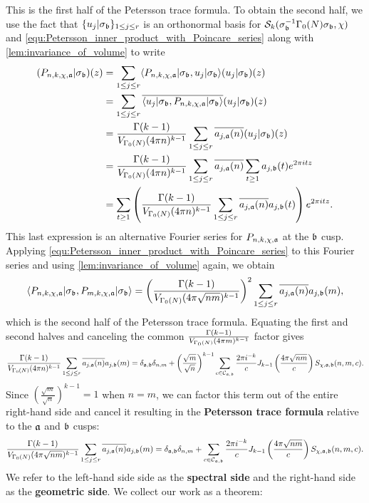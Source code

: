     This is the first half of the Petersson trace formula. To obtain the second half, we use the fact that $\{u_{j}|\sigma_{\mathfrak{b}}\}_{1 \le j \le r}$ is an orthonormal basis for $\mathcal{S}_{k}(\sigma_{\mathfrak{b}}^{-1}\Gamma_{0}(N)\sigma_{\mathfrak{b}},\chi)$ and \cref{equ:Petersson_inner_product_with_Poincare_series} along with \cref{lem:invariance_of_volume} to write
    \begin{align*}
      (P_{n,k,\chi,\mathfrak{a}}|\sigma_{\mathfrak{b}})(z) &= \sum_{1 \le j \le r}\langle P_{n,k,\chi,\mathfrak{a}}|\sigma_{\mathfrak{b}},u_{j}|\sigma_{\mathfrak{b}}\rangle(u_{j}|\sigma_{\mathfrak{b}})(z) \\
      &= \sum_{1 \le j \le r}\overline{\langle u_{j}|\sigma_{\mathfrak{b}},P_{n,k,\chi,\mathfrak{a}}|\sigma_{\mathfrak{b}}\rangle}(u_{j}|\sigma_{\mathfrak{b}})(z) \\
      &= \frac{\Gamma(k-1)}{V_{\Gamma_{0}(N)}(4\pi n)^{k-1}}\sum_{1 \le j \le r}\overline{a_{j,\mathfrak{a}}(n)}(u_{j}|\sigma_{\mathfrak{b}})(z) \\
      &= \frac{\Gamma(k-1)}{V_{\Gamma_{0}(N)}(4\pi n)^{k-1}}\sum_{1 \le j \le r}\overline{a_{j,\mathfrak{a}}(n)}\sum_{t \ge 1}a_{j,\mathfrak{b}}(t)e^{2\pi itz} \\
      &= \sum_{t \ge 1}\left(\frac{\Gamma(k-1)}{V_{\Gamma_{0}(N)}(4\pi n)^{k-1}}\sum_{1 \le j \le r}\overline{a_{j,\mathfrak{a}}(n)}a_{j,\mathfrak{b}}(t)\right)e^{2\pi itz}.
    \end{align*}
    This last expression is an alternative Fourier series for $P_{n,k,\chi,\mathfrak{a}}$ at the $\mathfrak{b}$ cusp. Applying \cref{equ:Petersson_inner_product_with_Poincare_series} to this Fourier series and using \cref{lem:invariance_of_volume} again, we obtain
    \[
      \langle P_{n,k,\chi,\mathfrak{a}}|\sigma_{\mathfrak{b}},P_{m,k,\chi,\mathfrak{a}}|\sigma_{\mathfrak{b}}\rangle = \left(\frac{\Gamma(k-1)}{V_{\Gamma_{0}(N)}(4\pi \sqrt{nm})^{k-1}}\right)^{2}\sum_{1 \le j \le r}\overline{a_{j,\mathfrak{a}}(n)}a_{j,\mathfrak{b}}(m),
    \]
    which is the second half of the Petersson trace formula. Equating the first and second halves and canceling the common $\frac{\Gamma(k-1)}{V_{\Gamma_{0}(N)}(4\pi m)^{k-1}}$ factor gives
    \[
      \frac{\Gamma(k-1)}{V_{\Gamma_{0}(N)}(4\pi n)^{k-1}}\sum_{1 \le j \le r}\overline{a_{j,\mathfrak{a}}(n)}a_{j,\mathfrak{b}}(m) = \delta_{\mathfrak{a},\mathfrak{b}}\delta_{n,m}+\left(\frac{\sqrt{m}}{\sqrt{n}}\right)^{k-1}\sum_{c \in \mathcal{C}_{\mathfrak{a},\mathfrak{b}}}\frac{2\pi i^{-k}}{c}J_{k-1}\left(\frac{4\pi\sqrt{nm}}{c}\right)S_{\chi,\mathfrak{a},\mathfrak{b}}(n,m,c).
    \]
    Since $\left(\frac{\sqrt{m}}{\sqrt{n}}\right)^{k-1} = 1$ when $n = m$, we can factor this term out of the entire right-hand side and cancel it resulting in the \textbf{Petersson trace formula} relative to the $\mathfrak{a}$ and $\mathfrak{b}$ cusps:
    \[
      \frac{\Gamma(k-1)}{V_{\Gamma_{0}(N)}(4\pi \sqrt{nm})^{k-1}}\sum_{1 \le j \le r}\overline{a_{j,\mathfrak{a}}(n)}a_{j,\mathfrak{b}}(m) = \delta_{\mathfrak{a},\mathfrak{b}}\delta_{n,m}+\sum_{c \in \mathcal{C}_{\mathfrak{a},\mathfrak{b}}}\frac{2\pi i^{-k}}{c}J_{k-1}\left(\frac{4\pi\sqrt{nm}}{c}\right)S_{\chi,\mathfrak{a},\mathfrak{b}}(n,m,c).
    \]
    We refer to the left-hand side side as the \textbf{spectral side} and the right-hand side as the \textbf{geometric side}. We collect our work as a theorem:


